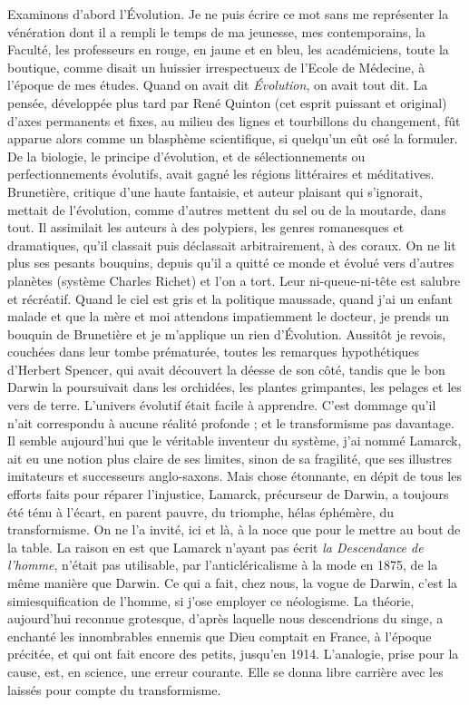 \documentclass[french,twoside]{book} %
\begin{document}
Examinons d’abord l’Évolution. Je ne puis écrire ce mot sans me représenter la vénération dont il a rempli le temps de ma jeunesse, mes contemporains, la Faculté, les professeurs en rouge, en jaune et en bleu, les académiciens, toute la boutique, comme disait un huissier irrespectueux de l’Ecole de Médecine, à l’époque de mes études. Quand on avait dit {\itshape Évolution}, on avait tout dit. La pensée, développée plus tard par René Quinton (cet esprit puissant et original) d’axes permanents et fixes, au milieu des lignes et tourbillons du changement, fût apparue alors comme un blasphème scientifique, si quelqu’un eût osé la formuler. De la biologie, le principe d’évolution, et de sélectionnements ou perfectionnements évolutifs, avait gagné les régions littéraires et méditatives. Brunetière, critique d’une haute fantaisie, et auteur plaisant qui s’ignorait, mettait de l’évolution, comme d’autres mettent du sel ou de la moutarde, dans tout. Il assimilait les auteurs à des polypiers, les genres romanesques et dramatiques, qu’il classait puis déclassait arbitrairement, à des coraux. On ne lit plus ses pesants bouquins, depuis qu’il a quitté ce monde et évolué vers d’autres planètes (système Charles Richet) et l’on a tort. Leur ni-queue-ni-tête est salubre et récréatif. Quand le ciel est gris et la politique maussade, quand j’ai un enfant malade et que la mère et moi attendons impatiemment le docteur, je prends un bouquin de Brunetière et je m’applique un rien d’Évolution. Aussitôt je revois, couchées dans leur tombe prématurée, toutes les remarques hypothétiques d’Herbert Spencer, qui avait découvert la déesse de son côté, tandis que le bon Darwin la poursuivait dans les orchidées, les plantes grimpantes, les pelages et les vers de terre. L’univers évolutif était facile à apprendre. C’est dommage qu’il n’ait correspondu à aucune réalité profonde ; et le transformisme pas davantage. Il semble aujourd’hui que le véritable inventeur du système, j’ai nommé Lamarck, ait eu une notion plus claire de ses limites, sinon de sa fragilité, que ses illustres imitateurs et successeurs anglo-saxons. Mais chose étonnante, en dépit de tous les efforts faits pour réparer l’injustice, Lamarck, précurseur de Darwin, a toujours été ténu à l’écart, en parent pauvre, du triomphe, hélas éphémère, du transformisme. On ne l’a invité, ici et là, à la noce que pour le mettre au bout de la table. La raison en est que Lamarck n’ayant pas écrit {\itshape la Descendance de l’homme}, n’était pas utilisable, par l’anticléricalisme à la mode en 1875, de la même manière que Darwin. Ce qui a fait, chez nous, la vogue de Darwin, c’est la simiesquification de l’homme, si j’ose employer ce néologisme. La théorie, aujourd’hui reconnue grotesque, d’après laquelle nous descendrions du singe, a enchanté les innombrables ennemis que Dieu comptait en France, à l’époque précitée, et qui ont fait encore des petits, jusqu’en 1914. L’analogie, prise pour la cause, est, en science, une erreur courante. Elle se donna libre carrière avec les laissés pour compte du transformisme.\par
\end{document}
